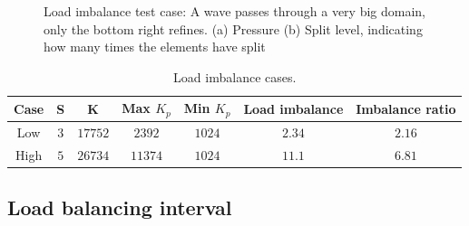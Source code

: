 \begin{figure}[H]
	\centering
	\hfill
	\caption{Load imbalance test case: A wave passes through a very big domain, only the bottom right refines. (a) Pressure (b) Split level, indicating how many times the elements have split}
	\label{fig:load_imbalance_case}
\end{figure}

\begin{table}[H]
	\centering
	\begin{tabular}{ c c c c c c c }
		Case & S & K & Max $K_p$ & Min $K_p$ & Load imbalance & Imbalance ratio \\
		\hline
		Low & $3$ & $17752$ & $2392$ & $1024$ & $2.34$ & $2.16$ \\
		High & $5$ & $26734$ & $11374$ & $1024$ & $11.1$ & $6.81$ \\
	\end{tabular}
	\caption{Load imbalance cases.}
	\label{table:load_imbalance}
\end{table}

\subsection{Load balancing interval} \label{subsection:results:load_balancing_performance:interval}

